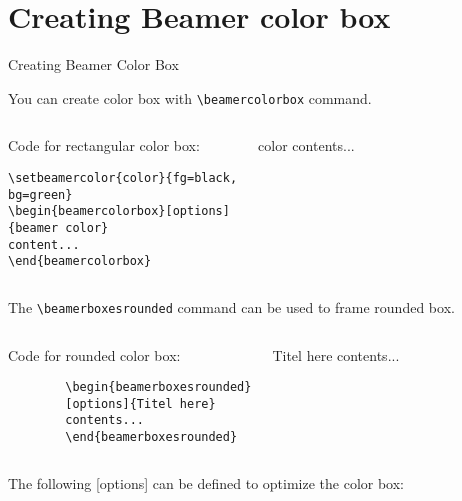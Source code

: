 \documentclass[10pt,xcolor=x11names]{beamer}
\begin{document}
\section{Creating Beamer color box }

\begin{frame}{Creating Beamer Color Box} 

You can create color box with \verb|\beamercolorbox| command. 

{\scriptsize
\begin{columns}[t]
\begin{block}{Code for rectangular color box:}
\begin{verbatim}
\setbeamercolor{color}{fg=black,
bg=green}
\begin{beamercolorbox}[options]
{beamer color}
content...
\end{beamercolorbox}
\end{verbatim}
\end{block}
	
 \vspace{12pt}
	\begin{beamercolorbox} [sep=0.5em,wd=5cm, ht=0.5cm]{color}
		contents...
\end{beamercolorbox}
\end{columns} }

\vspace{5pt}

The \verb|\beamerboxesrounded| command can be used to frame rounded box.

{\scriptsize
\begin{columns}[t]
\begin{block}{Code for rounded color box:}
\begin{verbatim}
		\begin{beamerboxesrounded}
		[options]{Titel here}
		contents...
		\end{beamerboxesrounded}
		\end{verbatim}
\end{block}
 \vspace{12pt}
\begin{beamerboxesrounded}[options]{Titel here}
contents...
\end{beamerboxesrounded}
\end{columns} }

The following [options] can be defined to optimize the color box:



\end{frame}
\end{document}
